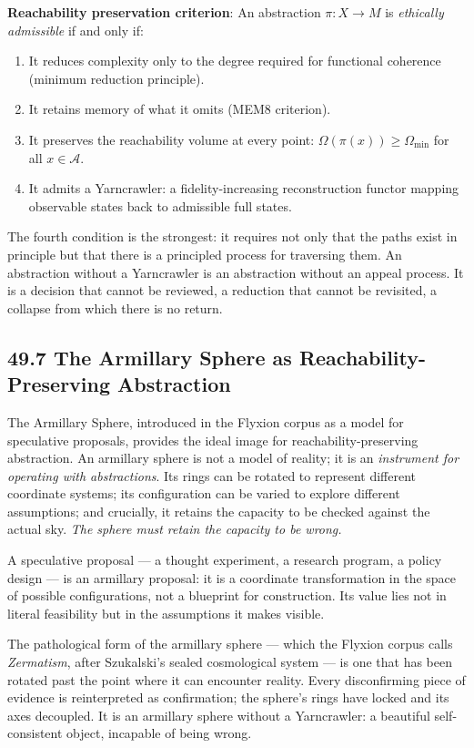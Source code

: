 \documentclass[12pt,letterpaper]{article}
\theoremstyle{remark}
\begin{document}
\begin{notebox}
\textbf{Reachability preservation criterion}: An abstraction $\pi:
X \to M$ is \emph{ethically admissible} if and only if:
\begin{enumerate}
\item It reduces complexity only to the degree required for
  functional coherence (minimum reduction principle).
\item It retains memory of what it omits (MEM\textbar{}8 criterion).
\item It preserves the reachability volume at every point:
  $\Omega(\pi(x)) \geq \Omega_{\min}$ for all $x \in \mathcal{A}$.
\item It admits a Yarncrawler: a fidelity-increasing reconstruction
  functor mapping observable states back to admissible full states.
\end{enumerate}
\end{notebox}

The fourth condition is the strongest: it requires not only that
the paths exist in principle but that there is a principled process
for traversing them. An abstraction without a Yarncrawler is an
abstraction without an appeal process. It is a decision that cannot
be reviewed, a reduction that cannot be revisited, a collapse from
which there is no return.

\subsection{49.7 The Armillary Sphere as Reachability-Preserving Abstraction}

The Armillary Sphere, introduced in the Flyxion corpus as a model
for speculative proposals, provides the ideal image for
reachability-preserving abstraction. An armillary sphere is not a
model of reality; it is an \emph{instrument for operating with
abstractions}. Its rings can be rotated to represent different
coordinate systems; its configuration can be varied to explore
different assumptions; and crucially, it retains the capacity to
be checked against the actual sky. \emph{The sphere must retain
the capacity to be wrong.}

A speculative proposal — a thought experiment, a research program,
a policy design — is an armillary proposal: it is a coordinate
transformation in the space of possible configurations, not a
blueprint for construction. Its value lies not in literal
feasibility but in the assumptions it makes visible.

The pathological form of the armillary sphere — which the Flyxion
corpus calls \emph{Zermatism}, after Szukalski's sealed
cosmological system — is one that has been rotated past the point
where it can encounter reality. Every disconfirming piece of
evidence is reinterpreted as confirmation; the sphere's rings have
locked and its axes decoupled. It is an armillary sphere without
a Yarncrawler: a beautiful self-consistent object, incapable of
being wrong.
\end{document}
